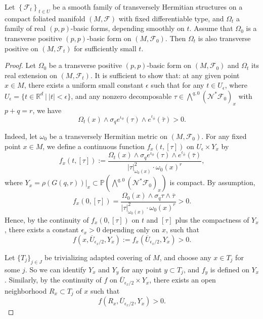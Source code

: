 \documentclass[10pt,a4paper]{amsart}
\def\mc{\mathcal}
\begin{document}
	\begin{proposition}
		Let $\left\{\mc F_t\right\}_{t\in U}$ be a smooth family of transversely Hermitian structures on a compact  foliated manifold $(M,\mc F)$ with fixed differentiable type, and $\Omega_t$ a family of real $(p,p)$-basic forms, depending smoothly on $t$.  Assume that $\Omega_0$ is a  transverse positive $(p,p)$-basic form on $(M,\mc F_0)$. Then $\Omega_t$ is also  transverse positive on $(M,\mc F_t)$ for sufficiently small $t$.
	\end{proposition}

	\begin{proof}
		Let $\Omega_0$ be a transverse positive $(p,p)$-basic form on $(M,\mc F_0)$ and $\Omega_t$ its real extension on $(M,\mc F_t)$.
		It is sufficient to show that: at any given point $x\in M$, there exists a uniform small constant $\epsilon$ such that for any $t\in U_\epsilon$, where $U_{\epsilon}=\{t \in \mathbb{R}^d\ \big |\ |t|<\epsilon \}$,  and any nonzero decomposable  $\tau\in\bigwedge^{q,0}(\mc N^*\mc F_0)_x$ with $p+q=r$, we have
		\begin{equation}\label{pkahler foliation transverse}
			\Omega_{t}(x) \wedge \sigma_{q}e^{{\iota_{\phi}}}(\tau) \wedge e^{\iota_{\bar\phi}} (\bar\tau)>0.
		\end{equation}
		
		
		
		Indeed, let $\omega_0$ be a transversely Hermitian metric on $(M,\mc F_0)$. For any fixed point $x \in M$, we define a continuous function $f_{x}(t,[\tau])$ on $U_{\epsilon} \times Y_{x}$ by
		\begin{equation}\label{definition f}
			f_{x}(t,[\tau]):=\frac{	\Omega_{t}(x) \wedge \sigma_{q} e^{\iota_\phi}(\tau) \wedge e^{\iota_{\bar\phi}} (\bar\tau)}{|\tau|_{\omega_0(x)}^{2} \cdot \omega_0(x)^{r}},
		\end{equation}
		where $Y_{x}=\left.\rho(G(q, r))\right|_{x} \subset \mathbb P\left(\bigwedge^{q,0}(\mc N^*\mc F_0)_x\right)$ is compact.  By assumption, $$f_{x}(0,[\tau])=\frac{	\Omega_{0}(x) \wedge \sigma_{q} \tau\wedge \overline\tau }{|\tau|_{\omega_0(x)}^{2} \cdot \omega_0(x)^{r}}>0.
		$$
		Hence, by the continuity of $f_{x}(0,[\tau])$ on $t$ and $[\tau]$ plus the compactness of $Y_x$, there exists a constant $\epsilon_x>0$ depending only on $x$, such that
		$$\label{12}
		f(x,\overline{U}_{\epsilon_x/2},Y_x):=f_{x}(\overline{U}_{\epsilon_x/2},Y_x)>0.
		$$
		
		Let   $\{T_j\}_{j\in J}$ be trivializing adapted covering of $M$,
		and choose any $x\in T_j$ for some $j$. So we can identify $Y_x$ and $Y_y$ for any point $y\subset T_j$, and $f_y$ is defined on $Y_x$.
		Similarly,   by the continuity of $f$ on $\overline{U}_{\epsilon_x/2}\times Y_x$, there exists an open neighborhood $R_x\subset T_j$ of $x$ such that
		$$
		f(R_x, \overline{U}_{\epsilon_x/2},Y_x)>0.
		$$
		

\end{proof}
\end{document}
